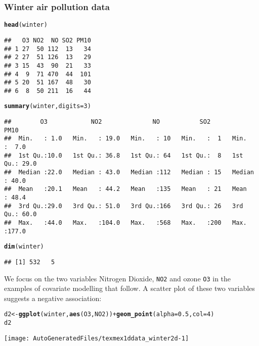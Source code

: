 \documentclass[10pt]{article}\usepackage[]{graphicx}\usepackage[]{color}
\makeatletter
\def\maxwidth{ %
  \ifdim\Gin@nat@width>\linewidth
    \linewidth
  \else
    \Gin@nat@width
  \fi
}
\newcommand{\hlnum}[1]{\textcolor[rgb]{0.686,0.059,0.569}{#1}}%
\newcommand{\hlopt}[1]{\textcolor[rgb]{0,0,0}{#1}}%
\newcommand{\hlstd}[1]{\textcolor[rgb]{0.345,0.345,0.345}{#1}}%
\newcommand{\hlkwb}[1]{\textcolor[rgb]{0.69,0.353,0.396}{#1}}%
\newcommand{\hlkwc}[1]{\textcolor[rgb]{0.333,0.667,0.333}{#1}}%
\newcommand{\hlkwd}[1]{\textcolor[rgb]{0.737,0.353,0.396}{\textbf{#1}}}%
\newenvironment{kframe}{%
 \def\at@end@of@kframe{}%
 \ifinner\ifhmode%
  \def\at@end@of@kframe{\end{minipage}}%
  \begin{minipage}{\columnwidth}%
 \fi\fi%
 \def\FrameCommand##1{\hskip\@totalleftmargin \hskip-\fboxsep
 \colorbox{shadecolor}{##1}\hskip-\fboxsep
     \hskip-\linewidth \hskip-\@totalleftmargin \hskip\columnwidth}%
 \MakeFramed {\advance\hsize-\width
   \@totalleftmargin\z@ \linewidth\hsize
   \@setminipage}}%
 {\par\unskip\endMakeFramed%
 \at@end@of@kframe}
\newenvironment{knitrout}{}{} %
\makeatother
\begin{document}
\subsubsection{Winter air pollution data}
\label{section:winterData}
\begin{knitrout}
\color{fgcolor}\begin{kframe}
\begin{alltt}
\hlkwd{head}\hlstd{(winter)}
\end{alltt}
\begin{verbatim}
##   O3 NO2  NO SO2 PM10
## 1 27  50 112  13   34
## 2 27  51 126  13   29
## 3 15  43  90  21   33
## 4  9  71 470  44  101
## 5 20  51 167  48   30
## 6  8  50 211  16   44
\end{verbatim}
\begin{alltt}
\hlkwd{summary}\hlstd{(winter,}\hlkwc{digits}\hlstd{=}\hlnum{3}\hlstd{)}
\end{alltt}
\begin{verbatim}
##        O3            NO2              NO           SO2           PM10      
##  Min.   : 1.0   Min.   : 19.0   Min.   : 10   Min.   :  1   Min.   :  7.0  
##  1st Qu.:10.0   1st Qu.: 36.8   1st Qu.: 64   1st Qu.:  8   1st Qu.: 29.0  
##  Median :22.0   Median : 43.0   Median :112   Median : 15   Median : 40.0  
##  Mean   :20.1   Mean   : 44.2   Mean   :135   Mean   : 21   Mean   : 48.4  
##  3rd Qu.:29.0   3rd Qu.: 51.0   3rd Qu.:166   3rd Qu.: 26   3rd Qu.: 60.0  
##  Max.   :44.0   Max.   :104.0   Max.   :568   Max.   :200   Max.   :177.0
\end{verbatim}
\begin{alltt}
\hlkwd{dim}\hlstd{(winter)}
\end{alltt}
\begin{verbatim}
## [1] 532   5
\end{verbatim}
\end{kframe}
\end{knitrout}
We focus on the two variables Nitrogen Dioxide, {\tt NO2} and ozone {\tt O3} in the examples of covariate modelling that follow.  A scatter plot of these two variables suggests a negative association:
\begin{knitrout}
\color{fgcolor}\begin{kframe}
\begin{alltt}
\hlstd{d2} \hlkwb{<-} \hlkwd{ggplot}\hlstd{(winter,}\hlkwd{aes}\hlstd{(O3,NO2))} \hlopt{+} \hlkwd{geom_point}\hlstd{(}\hlkwc{alpha}\hlstd{=}\hlnum{0.5}\hlstd{,}\hlkwc{col}\hlstd{=}\hlnum{4}\hlstd{)}
\hlstd{d2}
\end{alltt}
\end{kframe}
\texttt{[image: AutoGeneratedFiles/texmex1ddata\_winter2d-1]} 

\end{knitrout}
\end{document}

